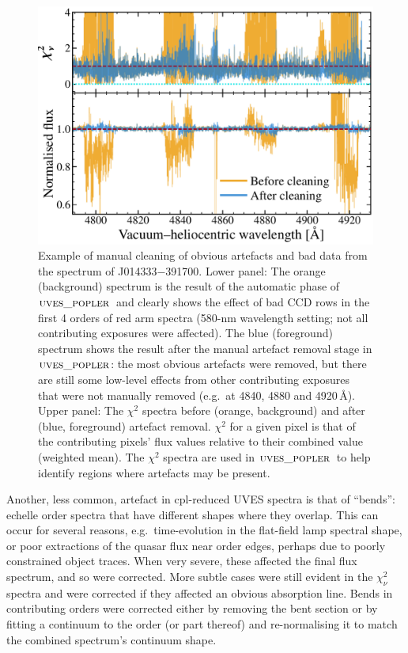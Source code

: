 \documentclass[fleqn,usenatbib,usedcolumn]{mnras}
\newcommand{\popler}{\ensuremath{\textsc{uves\_popler}}}
\begin{document}
\begin{figure}
\begin{center}
\includegraphics[width=0.95\columnwidth]{DR1_J014333-391700_baddata.pdf}
\vspace{-1em}
\caption{Example of manual cleaning of obvious artefacts and bad data from the spectrum of J014333$-$391700. Lower panel: The orange (background) spectrum is the result of the automatic phase of \popler\ and clearly shows the effect of bad CCD rows in the first 4 orders of red arm spectra (580-nm wavelength setting; not all contributing exposures were affected). The blue (foreground) spectrum shows the result after the manual artefact removal stage in \popler: the most obvious artefacts were removed, but there are still some low-level effects from other contributing exposures that were not manually removed (e.g.\ at 4840, 4880 and 4920\,\AA). Upper panel: The $\chi^2$ spectra before (orange, background) and after (blue, foreground) artefact removal. $\chi^2$ for a given pixel is that of the contributing pixels' flux values relative to their combined value (weighted mean). The $\chi^2$ spectra are used in \popler\ to help identify regions where artefacts may be present.}
\label{f:baddata}
\end{center}
\end{figure}

Another, less common, artefact in {\sc cpl}-reduced UVES spectra is that of ``bends'': echelle order spectra that have different shapes where they overlap. This can occur for several reasons, e.g.\ time-evolution in the flat-field lamp spectral shape, or poor extractions of the quasar flux near order edges, perhaps due to poorly constrained object traces. When very severe, these affected the final flux spectrum, and so were corrected. More subtle cases were still evident in the $\chi_\nu^2$ spectra and were corrected if they affected an obvious absorption line. Bends in contributing orders were corrected either by removing the bent section or by fitting a continuum to the order (or part thereof) and re-normalising it to match the combined spectrum's continuum shape.
\end{document}
